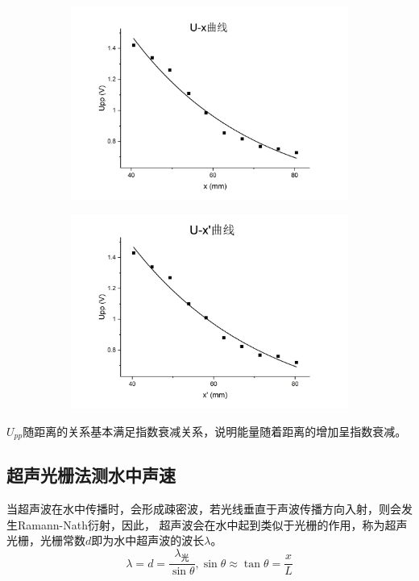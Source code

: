 \documentclass{article}
\begin{document}
    \begin{figure}[h]
        \begin{center}
            \begin{subfigure}[h]{0.48\textwidth}
                \includegraphics[width=\textwidth]{Upp-x curve.jpg}
            \end{subfigure}
            \begin{subfigure}[h]{0.48\textwidth}
                \includegraphics[width=\textwidth]{Upp-x' curve.jpg}
            \end{subfigure}
        \end{center}
    \end{figure}

    $U_{pp}$随距离的关系基本满足指数衰减关系，说明能量随着距离的增加呈指数衰减。
    \subsection{超声光栅法测水中声速}
    当超声波在水中传播时，会形成疎密波，若光线垂直于声波传播方向入射，则会发生Ramann-Nath衍射，因此，
    超声波会在水中起到类似于光栅的作用，称为超声光栅，光栅常数$d$即为水中超声波的波长$\lambda$。
    $$\lambda=d=\frac{\lambda_{\text{光}}}{\sin \theta},\sin \theta \approx \tan \theta = \frac{x}{L}$$
\end{document}
